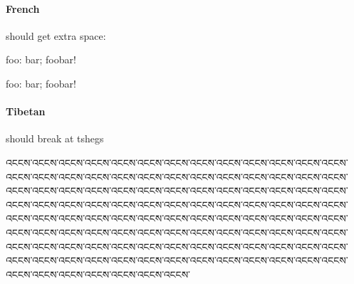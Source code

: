 \paragraph{French} should get extra space:

foo: bar; foobar!

\begin{french}foo: bar; foobar!\end{french}

\paragraph{Tibetan}should break at tshegs

\begin{tibetan}\raggedright
འངངས་འངངས་འངངས་འངངས་འངངས་འངངས་འངངས་འངངས་འངངས་འངངས་འངངས་འངངས་འངངས་འངངས་འངངས་འངངས་འངངས་འངངས་འངངས་འངངས་འངངས་འངངས་འངངས་འངངས་འངངས་འངངས་འངངས་འངངས་འངངས་འངངས་འངངས་འངངས་འངངས་འངངས་འངངས་འངངས་འངངས་འངངས་འངངས་འངངས་འངངས་འངངས་འངངས་འངངས་འངངས་འངངས་འངངས་འངངས་འངངས་འངངས་འངངས་འངངས་འངངས་འངངས་འངངས་འངངས་འངངས་འངངས་འངངས་འངངས་འངངས་འངངས་འངངས་འངངས་འངངས་འངངས་འངངས་འངངས་འངངས་འངངས་འངངས་འངངས་འངངས་འངངས་འངངས་འངངས་འངངས་འངངས་འངངས་འངངས་འངངས་འངངས་འངངས་འངངས་འངངས་འངངས་འངངས་འངངས་འངངས་འངངས་འངངས་འངངས་འངངས་འངངས་འངངས་འངངས་འངངས་འངངས་འངངས་འངངས་འངངས་འངངས་འངངས་འངངས་འངངས་འངངས་འངངས་འངངས་འངངས་འངངས་འངངས་

\end{tibetan}

